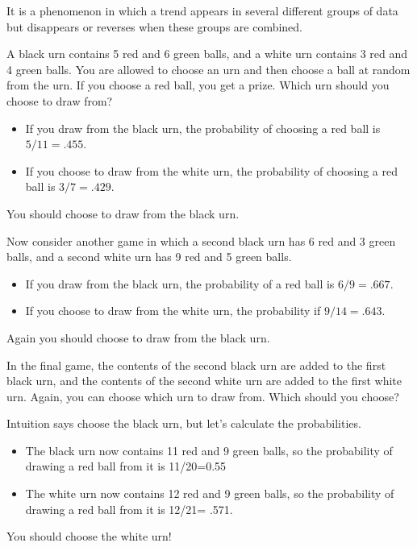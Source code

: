 It is a phenomenon in which a trend appears in several different
groups of data but disappears or reverses when these groups are
combined.

\begin{example}
A black urn contains 5 red and 6 green balls,
and a white urn contains 3 red and 4 green balls. You are allowed to
choose an urn and then choose a ball at random from the urn. If you
choose a red ball, you get a prize. Which urn should you choose to
draw from?

\begin{itemize}
\item If you draw from the black urn, the probability of choosing a
  red ball is $5/11 = .455$.
\item If you choose to draw from the white urn, the probability of
  choosing a red ball is $3/7 = .429$.
\end{itemize}

You should choose to draw from the black urn.

Now consider another game in which a second black urn has 6 red and
3 green balls, and a second white urn has 9 red and 5 green balls.

\begin{itemize}
\item If you draw from the black urn, the probability of a red ball is
  $6/9 = .667$.
\item If you choose to draw from the white urn, the probability if
  $9/14 = .643$.
\end{itemize}

Again you should choose to draw from the black urn.

In the final game, the contents of the second black urn are added to
the first black urn, and the contents of the second white urn are
added to the first white urn. Again, you can choose which urn to draw
from. Which should you choose?

Intuition says choose the black urn, but let's calculate the
probabilities.

\begin{itemize}
\item The black urn now contains 11 red and 9 green balls, so the
  probability of drawing a red ball from it is 11/20=0.55
\item The white urn now contains 12 red and 9 green balls, so the
  probability of drawing a red ball from it is 12/21= .571.
\end{itemize}

You should choose the white urn!
\end{example}

